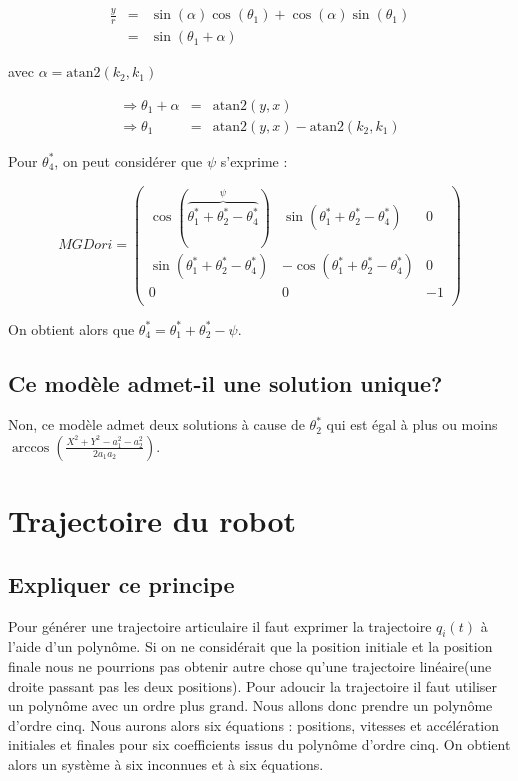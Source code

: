 \documentclass[]{article}
\begin{document}
\[
\begin{array}{lcl} 
  \frac{y}{r} & = & \sin(\alpha)\cos(\theta_1)+\cos(\alpha)\sin(\theta_1)\\
  & = & \sin(\theta_1+\alpha)
\end{array}
\]

avec $\alpha = \mathrm{atan2}(k_2,k_1)$

\[
\begin{array}{lcl} 
  \Rightarrow \theta_1 + \alpha & = & \mathrm{atan2}(y,x)\\
  \Rightarrow \theta_1 & = & \mathrm{atan2}(y,x) - \mathrm{atan2}(k_2,k_1)
\end{array}
\]


Pour $\theta^*_4$, on peut considérer que $\psi$ s'exprime :

\[ 
  MGDori =
  \begin{pmatrix}
    \cos (\overbrace{\theta^*_1+\theta^*_2-\theta^*_4}^{\psi}) & \sin (\theta^*_1+\theta^*_2-\theta^*_4) & 0 \\
    \sin (\theta^*_1+\theta^*_2-\theta^*_4) & -\cos (\theta^*_1+\theta^*_2-\theta^*_4) & 0 \\
    0 & 0 & -1\\
  \end{pmatrix}
\]

On obtient alors que $\theta^*_4 = \theta^*_1+\theta^*_2-\psi$.

\subsection{Ce modèle admet-il une solution unique?}

Non, ce modèle admet deux solutions à cause de $\theta^*_2$ qui est égal à plus ou moins $\arccos(\frac{X^2+Y^2-a_1^2-a_2^2}{2 a_1 a_2})$.

\section{Trajectoire du robot}

\subsection{Expliquer ce principe}

Pour générer une trajectoire articulaire il faut exprimer la trajectoire $q_i(t)$ à l'aide d'un polynôme. Si on ne considérait que la position initiale et la position finale nous ne pourrions pas obtenir autre chose qu'une trajectoire linéaire(une droite passant pas les deux positions). Pour adoucir la trajectoire il faut utiliser un polynôme avec un ordre plus grand. Nous allons donc prendre un polynôme d'ordre cinq. Nous aurons alors six équations : positions, vitesses et accélération initiales et finales pour six coefficients issus du polynôme d'ordre cinq. On obtient alors un système à six inconnues et à six équations.
\end{document}
